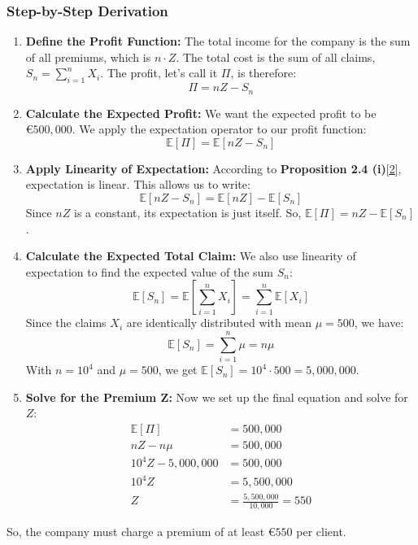 \documentclass[11pt,a4paper]{article}
\begin{document}
\subsubsection{Step-by-Step Derivation}
\begin{enumerate}
    \item \textbf{Define the Profit Function:} The total income for the company is the sum of all premiums, which is $n \cdot Z$. The total cost is the sum of all claims, $S_n = \sum_{i=1}^n X_i$. The profit, let's call it $\Pi$, is therefore:
    \[ \Pi = nZ - S_n \]

    \item \textbf{Calculate the Expected Profit:} We want the expected profit to be $€500,000$. We apply the expectation operator to our profit function:
    \[ \mathbb{E}[\Pi] = \mathbb{E}[nZ - S_n] \]

    \item \textbf{Apply Linearity of Expectation:} According to \textbf{Proposition 2.4 (i)}\hyperlink{note2}{[2]}, expectation is linear. This allows us to write:
    \[ \mathbb{E}[nZ - S_n] = \mathbb{E}[nZ] - \mathbb{E}[S_n] \]
    Since $nZ$ is a constant, its expectation is just itself. So, $\mathbb{E}[\Pi] = nZ - \mathbb{E}[S_n]$.

    \item \textbf{Calculate the Expected Total Claim:} We also use linearity of expectation to find the expected value of the sum $S_n$:
    \[ \mathbb{E}[S_n] = \mathbb{E}\left[\sum_{i=1}^n X_i\right] = \sum_{i=1}^n \mathbb{E}[X_i] \]
    Since the claims $X_i$ are identically distributed with mean $\mu = 500$, we have:
    \[ \mathbb{E}[S_n] = \sum_{i=1}^n \mu = n\mu \]
    With $n=10^4$ and $\mu=500$, we get $\mathbb{E}[S_n] = 10^4 \cdot 500 = 5,000,000$.

    \item \textbf{Solve for the Premium Z:} Now we set up the final equation and solve for $Z$:
    \begin{align*}
        \mathbb{E}[\Pi] &= 500,000 \\
        nZ - n\mu &= 500,000 \\
        10^4 Z - 5,000,000 &= 500,000 \\
        10^4 Z &= 5,500,000 \\
        Z &= \frac{5,500,000}{10,000} = 550
    \end{align*}
\end{enumerate}
So, the company must charge a premium of at least \textbf{$€550$} per client.
\end{document}
